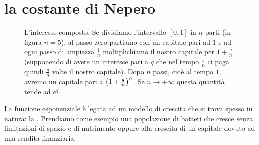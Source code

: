 \section{la costante di Nepero}

\begin{figure}
  \begin{center}
  \end{center}
  \caption{L'interesse composto.
  Se dividiamo l'intervallo $[0,1]$
  in $n$ parti (in figura $n=5$), al passo zero
  partiamo con un capitale pari ad $1$ e ad ogni
  passo di ampiezza $\frac 1 n$ moltiplichiamo
  il nostro capitale per $1+\frac q n$ (supponendo
  di avere un interesse pari a $q$ che
  nel tempo $\frac 1 n$ ci paga quindi $\frac q n$
  volte il nostro capitale).
  Dopo
  $n$ passi, cioè al tempo $1$, avremo
  un capitale pari a ${\left( 1+\frac q n \right)}^n$.
  Se $n\to+\infty$ questa quantità tende ad $e^q$.}
  \label{fig:nepero}
\end{figure}


La funzione esponenziale è legata ad un modello di crescita che si trova spesso
in natura: la .
Prendiamo come esempio una popolazione di batteri che cresce senza
limitazioni di spazio e di nutrimento oppure
alla crescita di un capitale dovuto ad una rendita finanziaria.


